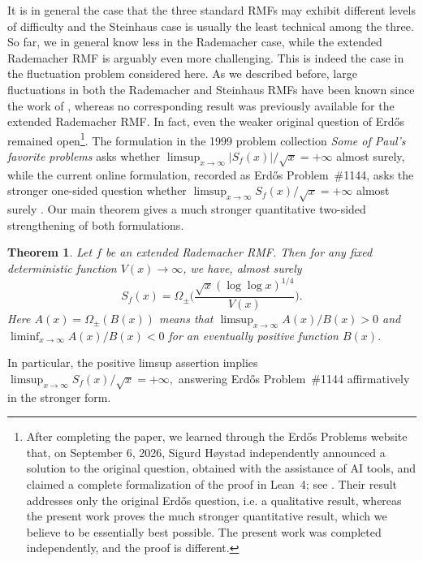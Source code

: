 \documentclass[a4paper,12pt,reqno]{amsart}
\numberwithin{equation}{section}
\newtheorem{theorem}{Theorem}[section]
\theoremstyle{remark}
\begin{document}
It is in general the case that the three standard RMFs may exhibit
 different levels of difficulty and the Steinhaus case is usually the least technical among the
three. So far, we in general know less in the Rademacher case, while the extended
Rademacher RMF is arguably even more challenging.
This is indeed the case in the fluctuation problem considered here. As we described before, large fluctuations in both the Rademacher and Steinhaus RMFs
have been known since the work of \citet{Harper2023Large}, whereas no corresponding result
was previously available for the extended Rademacher
RMF. In fact, even the weaker original question of Erd\H{o}s remained
open\footnote{After completing the paper, 
we learned through the Erd\H{o}s Problems website that, on September 6, 2026,
Sigurd H{\o}ystad independently announced a solution to the original
question, obtained with the assistance of AI tools, and claimed a complete
formalization of the proof in Lean~4; see \cite{Hoystad2026}.
Their result addresses only the original Erd\H{o}s question, i.e. a qualitative result, whereas the
present work proves the much stronger quantitative result, which we believe to be essentially best possible. The present work was completed independently, and
the proof is different.}. 
The formulation in the 1999 problem collection \emph{Some of Paul's
favorite problems} asks whether
$\limsup_{x\to\infty}|S_f(x)|/\sqrt{x}=+\infty$ almost surely, while the
current online formulation, recorded as Erd\H{o}s Problem~\#1144, asks the
stronger one-sided question whether
$\limsup_{x\to\infty}S_f(x)/\sqrt{x}=+\infty$ almost surely
\cite{PaulsProblems1999,Bloom1144}. 
Our main theorem gives a much stronger quantitative
two-sided strengthening of both formulations.


\begin{theorem}\label{thm:main}
Let $f$ be an extended Rademacher RMF. Then for any fixed deterministic function $V(x)\to\infty$, we have,  almost surely 
\begin{equation}\label{eq:main-theorem-positive}
 S_f(x)=\Omega_{\pm}\bigg(
 \frac{\sqrt{x}(\log\log x)^{1/4}}{V(x)}\bigg).
\end{equation}
Here \(A(x)=\Omega_{\pm}(B(x))\) means that
\(
\limsup_{x\to\infty}{A(x)}/{B(x)}>0\) and \(\liminf_{x\to\infty}{A(x)}/{B(x)}<0 \) for an eventually positive function \(B(x)\).
\end{theorem}


In particular, the positive limsup assertion implies 
$
 \limsup_{x\to\infty}{S_f(x)}/{\sqrt{x}}=+\infty,
$
answering Erd\H{o}s Problem~\#1144 affirmatively in the stronger form.
\end{document}
